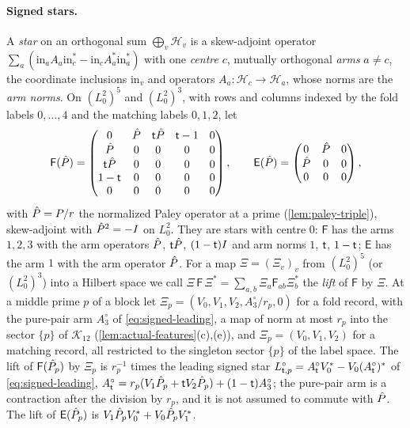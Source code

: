 \paragraph{Signed stars.}
A \emph{star} on an orthogonal sum $\bigoplus_v\mathcal H_v$ is a skew-adjoint
operator $\sum_a(\mathrm{in}_aA_a\mathrm{in}_c^*-\mathrm{in}_cA_a^*\mathrm{in}_a^*)$ with one
\emph{centre} $c$, mutually orthogonal \emph{arms} $a\ne c$, the coordinate
inclusions $\mathrm{in}_v$ and operators $A_a\colon\mathcal H_c\to\mathcal H_a$, whose norms
are the \emph{arm norms}. On $(L^2_0)^5$ and $(L^2_0)^3$, with rows and columns
indexed by the fold labels $0,\dots,4$ and the matching labels $0,1,2$, let
\begin{equation}\label{eq:signed-star}
 \mathsf F(\hat P)=\begin{pmatrix}0&\hat P&\mathsf t\hat P&\mathsf t-1&0\\
 \hat P&0&0&0&0\\ \mathsf t\hat P&0&0&0&0\\ 1-\mathsf t&0&0&0&0\\ 0&0&0&0&0\end{pmatrix},
 \qquad
 \mathsf E(\hat P)=\begin{pmatrix}0&\hat P&0\\ \hat P&0&0\\ 0&0&0\end{pmatrix},
\end{equation}
with $\hat P=P/r$ the normalized Paley operator at a prime (\cref{lem:paley-triple}),
skew-adjoint with $\hat P^2=-I$ on $L^2_0$. They are stars with centre $0$: $\mathsf F$
has the arms $1,2,3$ with the arm operators $\hat P$, $\mathsf t\hat P$, $(1-\mathsf t)I$ and
arm norms $1$, $\mathsf t$, $1-\mathsf t$; $\mathsf E$ has the arm $1$ with the arm operator
$\hat P$. For a map $\Xi=(\Xi_v)_v$ from $(L^2_0)^5$ (or $(L^2_0)^3$) into a Hilbert space
we call $\Xi\,\mathsf F\,\Xi^*=\sum_{a,b}\Xi_a\mathsf F_{ab}\Xi_b^*$ the \emph{lift} of
$\mathsf F$ by $\Xi$. At a middle prime $p$ of a block let
$\Xi_p=(V_0,V_1,V_2,A_3^\circ/r_p,0)$ for a fold record, with the pure-pair arm
$A_3^\circ$ of \eqref{eq:signed-leading}, a map of norm at most $r_p$ into the
sector $\{p\}$ of $\mathcal K_{12}$ (\cref{lem:actual-features}(c),(e)), and
$\Xi_p=(V_0,V_1,V_2)$ for a matching record, all restricted to the singleton sector
$\{p\}$ of the label space. The lift of $\mathsf F(\hat P_p)$ by $\Xi_p$ is $r_p^{-1}$
times the leading signed star $L^\circ_{\mathsf t,p}=A^\circ_\mathsf t V_0^*-V_0(A^\circ_\mathsf t)^*$
of \eqref{eq:signed-leading}, $A^\circ_\mathsf t=r_p(V_1\hat P_p+\mathsf t V_2\hat P_p)
+(1-\mathsf t)A_3^\circ$; the pure-pair arm is a contraction after the division by
$r_p$, and it is not assumed to commute with $\hat P$. The lift of $\mathsf E(\hat P_p)$
is $V_1\hat P_pV_0^*+V_0\hat P_pV_1^*$.

